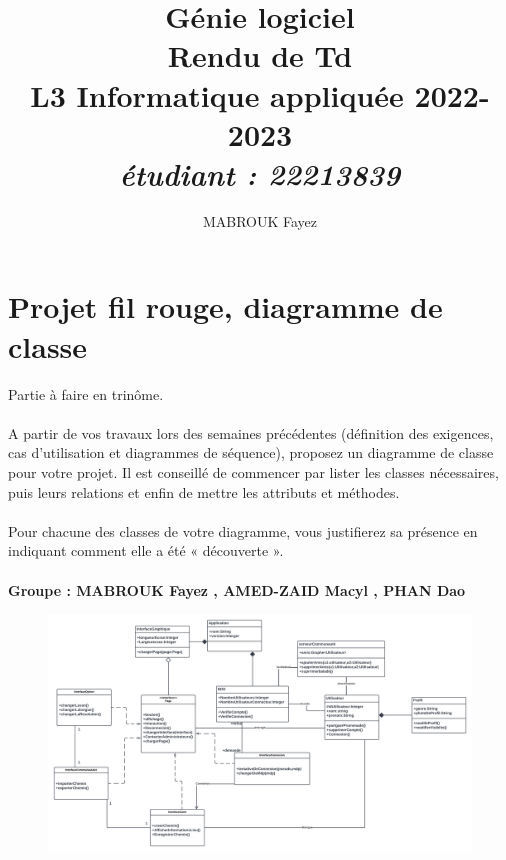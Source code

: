 \documentclass[12pt]{article}
\date{}
\author{MABROUK Fayez}
\title{{\bf  Génie logiciel} \\
	Rendu de Td \no 11  \\
	{\small L3 Informatique appliquée 2022-2023} \\
	{\it \small \no étudiant : 22213839}}
\begin{document}
	\maketitle
	\newpage
	\section{Projet fil rouge, diagramme de classe}
	
	Partie à faire en trinôme.\\
	\\
	A partir de vos travaux lors des semaines précédentes (définition des exigences, cas d’utilisation et
	diagrammes de séquence), proposez un diagramme de classe pour votre projet. Il est conseillé de
	commencer par lister les classes nécessaires, puis leurs relations et enfin de mettre les attributs et
	méthodes.\\
	\\
	Pour chacune des classes de votre diagramme, vous justifierez sa présence en indiquant comment
	elle a été « découverte ».\\
	\\
	\textbf{Groupe : MABROUK Fayez , AMED-ZAID Macyl , PHAN Dao}
		\begin{figure}[!hbtp]
		\centering
		\includegraphics[scale=0.44]{Blank diagram (1).png}
	\end{figure}
\end{document}
